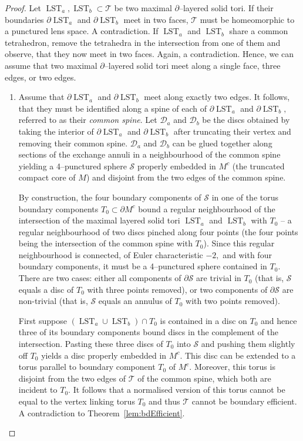 \documentclass[a4paper]{gtart}
\def\lst{\operatorname{LST}}
\def\tri{\mathcal{T}}
\def\manifold{M}
\def\core{M^c}
\theoremstyle{plain}
\theoremstyle{definition}
\theoremstyle{remark}
\numberwithin{equation}{section}
\begin{document}
\begin{proof}
Let $\lst_a, \lst_b \subset \tri$ be two maximal $\partial$--layered solid tori. If their boundaries $\partial \lst_a$ and $\partial \lst_b$ meet in two faces, $\tri$ must be homeomorphic to a punctured lens space. A contradiction. If $\lst_a$ and $\lst_b$ share a common tetrahedron, remove the tetrahedra in the intersection from one of them and observe, that they now meet in two faces. Again, a contradiction. Hence, we can assume that two maximal $\partial$--layered solid tori meet along a single face, three edges, or two edges.

\begin{enumerate}
    \item Assume that $\partial \lst_a$ and $\partial \lst_b$ meet along exactly two edges. It follows, that they must be identified along a spine of each of $\partial \lst_a$ and $\partial \lst_b,$ referred to as their {\em common spine}. Let $\mathcal{D}_a$ and $\mathcal{D}_b$ be the discs obtained by taking the interior of $\partial \lst_a$ and $\partial \lst_b$ after truncating their vertex and removing their common spine. $\mathcal{D}_a$ and $\mathcal{D}_b$ can be glued together along sections of the exchange annuli in a neighbourhood of the common spine yielding a 4--punctured sphere $\mathcal{S}$ properly embedded in $\core$ (the truncated compact core of $\manifold$) and disjoint from the two edges of the common spine.

By construction, the four boundary components of $\mathcal{S}$ in one of the torus boundary components $T_0\subset \partial \core$ bound a regular neighbourhood of the intersection of the maximal layered solid tori $\lst_a$ and $\lst_b$ with $T_0$ -- a regular neighbourhood of two discs pinched along four points (the four points being the intersection of the common spine with $T_0$). Since this regular neighbourhood is connected, of Euler characteristic $-2,$ and with four boundary components, it must be a 4--punctured sphere contained in $T_0.$ There are two cases: either all components of $\partial\mathcal{S}$ are trivial in $T_0$ (that is, $\mathcal{S}$ equals a disc of $T_0$ with three points removed), or two components of $\partial\mathcal{S}$ are non-trivial (that is, $\mathcal{S}$ equals an annulus of $T_0$ with two points removed).

First suppose $(\lst_a \cup \lst_b) \cap T_0$ is contained in a disc on $T_0$ and hence three of its boundary components bound discs in the complement of the intersection. Pasting these three discs of $T_0$ into $\mathcal{S}$ and pushing them slightly off $T_0$ yields a disc properly embedded in $\core.$ This disc can be extended to a torus parallel to boundary component $T_0$ of $\core$. Moreover, this torus is disjoint from the two edges of $\tri$ of the common spine, which both are incident to $T_0$. It follows that a normalised version of this torus cannot be equal to the vertex linking torus $T_0$ and thus $\tri$ cannot be boundary efficient. A contradiction to Theorem~\ref{lem:bdEfficient}. 


\end{enumerate}
\end{proof}
\end{document}
